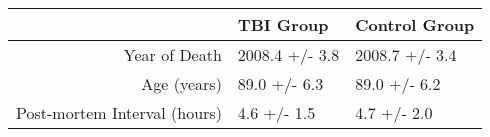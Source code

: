 \begin{table}[ht]
\centering
\begin{tabular}{rll}
  \hline
 & TBI Group & Control Group \\ 
  \hline
Year of Death & 2008.4 +/- 3.8 & 2008.7 +/- 3.4 \\ 
  Age (years) & 89.0 +/- 6.3 & 89.0 +/- 6.2 \\ 
  Post-mortem Interval (hours) & 4.6 +/- 1.5 & 4.7 +/- 2.0 \\ 
   \hline
\end{tabular}
\end{table}
